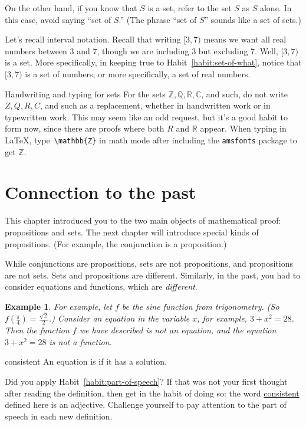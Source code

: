 \documentclass{book}
\newcounter{ekcounter}%
\theoremstyle{ekimcustom}
\newtheorem{example}[ekcounter]{Example}
\newcommand\defn[1]{{\color{blue}{\bf #1}}}
\begin{document}
On the other hand, if you know that $S$ is a set, refer to the set $S$ as $S$ alone. In this case, avoid saying ``set of $S$.'' (The phrase ``set of $S$'' sounds like a set of sets.) 

Let's recall interval notation. Recall that writing $[3,7)$ means we want all real numbers between $3$ and $7$, though we are including $3$ but excluding $7$. Well, $[3,7)$ is a set. More specifically, in keeping true to Habit~\ref{habit:set-of-what}, notice that $[3,7)$ is a set of numbers, or more specifically, a set of real numbers.

\begin{bhabit}{Handwriting and typing for sets}{}
For the sets $\mathbb{Z}, \mathbb{Q}, \mathbb{R}, \mathbb{C}$, and such, do not write $Z,Q,R,C$, and such as a replacement, whether in handwritten work or in typewritten work. This may seem like an odd request, but it's a good habit to form now, since there are proofs where both $R$ and $\mathbb{R}$ appear. When typing in \LaTeX{}, type~\verb+\mathbb{Z}+ in math mode after including the \verb+amsfonts+ package to get $\mathbb{Z}$.
\end{bhabit}

\section{Connection to the past}

This chapter introduced you to the two main objects of mathematical proof: propositions and sets. The next chapter will introduce special kinds of propositions. (For example, the conjunction is a proposition.)

While conjunctions are propositions, sets are not propositions, and propositions are not sets. Sets and propositions are different. Similarly, in the past, you had to consider equations and functions, which are \emph{different}.
\begin{example}
For example, let $f$ be the sine function from trigonometry. (So $f(\frac\pi4)=\frac{\sqrt{2}}2$.) Consider an equation in the variable $x$, for example, $3+x^2=28$. Then the function $f$ we have described is not an equation, and the equation $3+x^2=28$ is not a function.
\end{example}

\begin{bdefinition}{}{consistent}
An equation is \defn{consistent} if it has a solution.
\end{bdefinition}
Did you apply Habit~\ref{habit:part-of-speech}? If that was not your first thought after reading the definition, then get in the habit of doing so: the word \underline{consistent} defined here is an adjective. Challenge yourself to pay attention to the part of speech in each new definition.
\end{document}
